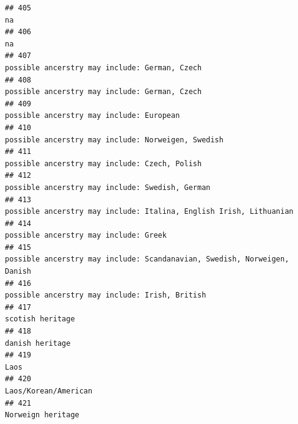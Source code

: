 \documentclass[]{article}
\begin{document}
\begin{verbatim}
## 405                                                                                                                                                  na
## 406                                                                                                                                                  na
## 407                                                                                                       possible ancerstry may include: German, Czech
## 408                                                                                                       possible ancerstry may include: German, Czech
## 409                                                                                                            possible ancerstry may include: European
## 410                                                                                                  possible ancerstry may include: Norweigen, Swedish
## 411                                                                                                       possible ancerstry may include: Czech, Polish
## 412                                                                                                     possible ancerstry may include: Swedish, German
## 413                                                                                  possible ancerstry may include: Italina, English Irish, Lithuanian
## 414                                                                                                               possible ancerstry may include: Greek
## 415                                                                            possible ancerstry may include: Scandanavian, Swedish, Norweigen, Danish
## 416                                                                                                      possible ancerstry may include: Irish, British
## 417                                                                                                                                    scotish heritage
## 418                                                                                                                                     danish heritage
## 419                                                                                                                                                Laos
## 420                                                                                                                                Laos/Korean/American
## 421                                                                                                                                   Norweign heritage

\end{verbatim}
\end{document}
